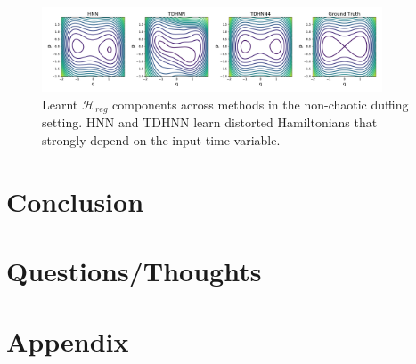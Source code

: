 \documentclass[twoside]{article}
\begin{document}
\begin{figure}[h]
\centering
\includegraphics[width=0.9\textwidth]{figures/duffing_ham_1.pdf}
\caption{Learnt $\mathcal{H}_{reg}$ components across methods in the non-chaotic duffing setting. HNN and TDHNN learn distorted Hamiltonians that strongly depend on the input time-variable. }
\end{figure}

\section{Conclusion}

\section{Questions/Thoughts}




\section*{Appendix}
\end{document}
